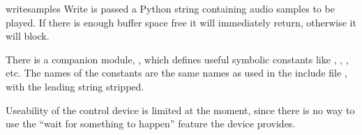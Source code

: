 \begin{methoddesc}{write}{samples}
Write is passed a Python string containing audio samples to be played.
If there is enough buffer space free it will immediately return,
otherwise it will block.
\end{methoddesc}

There is a companion module,
, which defines useful
symbolic constants like , ,
, etc. The names of the constants are the same names
as used in the \C{} include file , with the
leading string  stripped.

Useability of the control device is limited at the moment, since there
is no way to use the ``wait for something to happen'' feature the
device provides.
